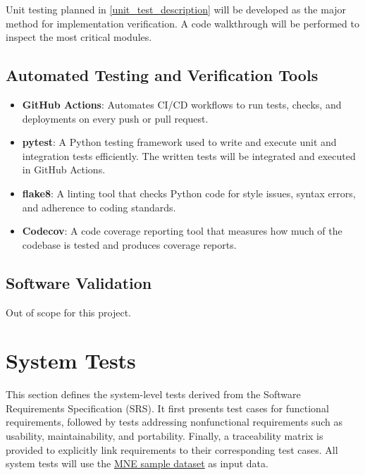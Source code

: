 \documentclass[12pt, titlepage]{article}
\begin{document}
Unit testing planned in \autoref{unit_test_description} will be developed as the major method for implementation verification. A code walkthrough will be performed to inspect the most critical modules.




\subsection{Automated Testing and Verification Tools}


\begin{itemize}
    \item \textbf{GitHub Actions}: Automates CI/CD workflows to run tests, checks, and deployments on every push or pull request.
    \item \textbf{pytest}: A Python testing framework used to write and execute unit and integration tests efficiently. The written tests will be integrated and executed in GitHub Actions.
    \item \textbf{flake8}: A linting tool that checks Python code for style issues, syntax errors, and adherence to coding standards.
    \item \textbf{Codecov}: A code coverage reporting tool that measures how much of the codebase is tested and produces coverage reports.
\end{itemize}




\subsection{Software Validation}


Out of scope for this project.












\section{System Tests}


This section defines the system-level tests derived from the Software Requirements Specification (SRS). It first presents test cases for functional requirements, followed by tests addressing nonfunctional requirements such as usability, maintainability, and portability. Finally, a traceability matrix is provided to explicitly link requirements to their corresponding test cases. All system tests will use the \href{https://mne.tools/stable/documentation/datasets.html#sample}{MNE sample dataset} as input data.
\end{document}

